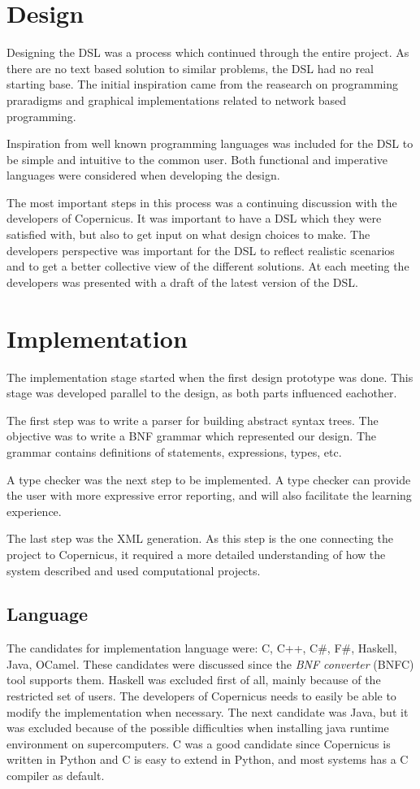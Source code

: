 \section{Design}
Designing the DSL was a process which continued through the entire
project. As there are no text based solution to similar problems, the
DSL had no real starting base. The initial inspiration came from the
reasearch on programming praradigms and graphical implementations
related to network based programming.

Inspiration from well known programming languages was included for the
DSL to be simple and intuitive to the common user. Both functional and
imperative languages were considered when developing the design.

The most important steps in this process was a continuing discussion
with the developers of Copernicus. It was important to have a DSL
which they were satisfied with, but also to get input on what design
choices to make. The developers perspective was important for the DSL
to reflect realistic scenarios and to get a better collective view of
the different solutions. At each meeting the developers was presented
with a draft of the latest version of the DSL.


\section{Implementation}
The implementation stage started when the first design prototype was
done. This stage was developed parallel to the design, as both parts
influenced eachother.

The first step was to write a parser for building abstract syntax
trees. The objective was to write a BNF grammar which represented our
design. The grammar contains definitions of statements, expressions,
types, etc.

A type checker was the next step to be implemented. A type checker can
provide the user with more expressive error reporting, and will also
facilitate the learning experience.

The last step was the XML generation. As this step is the one
connecting the project to Copernicus, it required a more detailed
understanding of how the system described and used computational
projects.




\subsection{Language}
The candidates for implementation language were: C, C++, C\#, F\#,
Haskell, Java, OCamel. These candidates were discussed since the
\emph{BNF converter} (BNFC) tool supports them. \citep{bnfc:online}
Haskell was excluded first of all, mainly because of the restricted
set of users. The developers of Copernicus needs to easily be able to
modify the implementation when necessary. The next candidate was Java,
but it was excluded because of the possible difficulties when
installing java runtime environment on supercomputers. C was a good
candidate since Copernicus is written in Python and C is easy to
extend in Python, and most systems has a C compiler as default.

